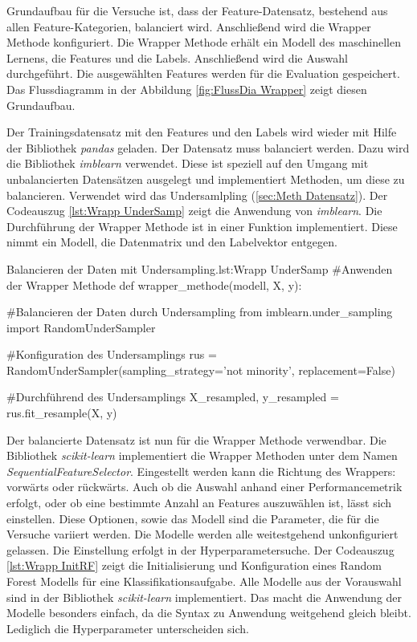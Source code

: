 Grundaufbau für die Versuche ist, dass der Feature-Datensatz, bestehend aus allen Feature-Kategorien, balanciert wird. Anschließend wird die Wrapper Methode konfiguriert. Die Wrapper Methode erhält ein Modell des maschinellen Lernens, die Features und die Labels. Anschließend wird die Auswahl durchgeführt. Die ausgewählten Features werden für die Evaluation gespeichert. Das Flussdiagramm in der Abbildung \ref{fig:FlussDia Wrapper} zeigt diesen Grundaufbau. 

Der Trainingsdatensatz mit den Features und den Labels wird wieder mit Hilfe der Bibliothek \textit{pandas} geladen. Der Datensatz muss balanciert werden. Dazu wird die Bibliothek \textit{imblearn} verwendet. Diese ist speziell auf den Umgang mit unbalancierten Datensätzen ausgelegt und implementiert Methoden, um diese zu balancieren. Verwendet wird das Undersamlpling (\autoref{sec:Meth Datensatz}). Der Codeauszug \ref{lst:Wrapp UnderSamp} zeigt die Anwendung von \textit{imblearn}. Die Durchführung der Wrapper Methode ist in einer Funktion implementiert. Diese nimmt ein Modell, die Datenmatrix und den Labelvektor entgegen. 

\begin{pythoncode}{Balancieren der Daten mit Undersampling.}{lst:Wrapp UnderSamp}
#Anwenden der Wrapper Methode
def wrapper_methode(modell, X, y):

    #Balancieren der Daten durch Undersampling
    from imblearn.under_sampling import RandomUnderSampler

    #Konfiguration des Undersamplings
    rus = RandomUnderSampler(sampling_strategy='not minority', 
                             replacement=False)
    
    #Durchführend des Undersamplings
    X_resampled, y_resampled = rus.fit_resample(X, y)

\end{pythoncode}

Der balancierte Datensatz ist nun für die Wrapper Methode verwendbar. Die Bibliothek \textit{scikit-learn} implementiert die Wrapper Methoden unter dem Namen \textit{SequentialFeatureSelector}. Eingestellt werden kann die Richtung des Wrappers: vorwärts oder rückwärts. Auch ob die Auswahl anhand einer Performancemetrik erfolgt, oder ob eine bestimmte Anzahl an Features auszuwählen ist, lässt sich einstellen. Diese Optionen, sowie das Modell sind die Parameter, die für die Versuche variiert werden. Die Modelle werden alle weitestgehend unkonfiguriert gelassen. Die Einstellung erfolgt in der Hyperparametersuche. Der Codeauszug \ref{lst:Wrapp InitRF} zeigt die Initialisierung und Konfiguration eines Random Forest Modells für eine Klassifikationsaufgabe. Alle Modelle aus der Vorauswahl sind in der Bibliothek \textit{scikit-learn} implementiert. Das macht die Anwendung der Modelle besonders einfach, da die Syntax zu Anwendung weitgehend gleich bleibt. Lediglich die Hyperparameter unterscheiden sich. 

